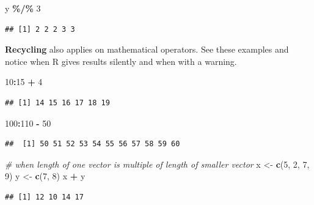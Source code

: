\documentclass[
]{book}
\newenvironment{Shaded}{\begin{snugshade}}{\end{snugshade}}
\newcommand{\CommentTok}[1]{\textcolor[rgb]{0.56,0.35,0.01}{\textit{#1}}}
\newcommand{\DecValTok}[1]{\textcolor[rgb]{0.00,0.00,0.81}{#1}}
\newcommand{\FunctionTok}[1]{\textcolor[rgb]{0.13,0.29,0.53}{\textbf{#1}}}
\newcommand{\NormalTok}[1]{#1}
\newcommand{\OtherTok}[1]{\textcolor[rgb]{0.56,0.35,0.01}{#1}}
\newcommand{\SpecialCharTok}[1]{\textcolor[rgb]{0.81,0.36,0.00}{\textbf{#1}}}
\begin{document}
\begin{Shaded}
\begin{Highlighting}[]
\NormalTok{y }\SpecialCharTok{\%/\%} \DecValTok{3}
\end{Highlighting}
\end{Shaded}

\begin{verbatim}
## [1] 2 2 2 3 3
\end{verbatim}

\textbf{Recycling} also applies on mathematical operators. See these examples and notice when R gives results silently and when with a warning.

\begin{Shaded}
\begin{Highlighting}[]
\DecValTok{10}\SpecialCharTok{:}\DecValTok{15} \SpecialCharTok{+} \DecValTok{4}
\end{Highlighting}
\end{Shaded}

\begin{verbatim}
## [1] 14 15 16 17 18 19
\end{verbatim}

\begin{Shaded}
\begin{Highlighting}[]
\DecValTok{100}\SpecialCharTok{:}\DecValTok{110} \SpecialCharTok{{-}} \DecValTok{50}
\end{Highlighting}
\end{Shaded}

\begin{verbatim}
##  [1] 50 51 52 53 54 55 56 57 58 59 60
\end{verbatim}

\begin{Shaded}
\begin{Highlighting}[]
\CommentTok{\# when length of one vector is multiple of length of smaller vector}
\NormalTok{x }\OtherTok{\textless{}{-}} \FunctionTok{c}\NormalTok{(}\DecValTok{5}\NormalTok{, }\DecValTok{2}\NormalTok{, }\DecValTok{7}\NormalTok{, }\DecValTok{9}\NormalTok{)}
\NormalTok{y }\OtherTok{\textless{}{-}} \FunctionTok{c}\NormalTok{(}\DecValTok{7}\NormalTok{, }\DecValTok{8}\NormalTok{)}
\NormalTok{x }\SpecialCharTok{+}\NormalTok{ y}
\end{Highlighting}
\end{Shaded}

\begin{verbatim}
## [1] 12 10 14 17
\end{verbatim}
\end{document}
